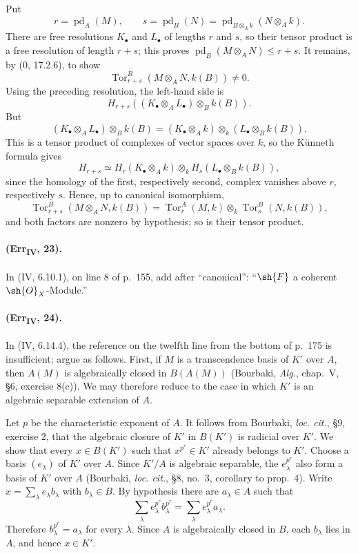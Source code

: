 Put
\[
 r=\operatorname{pd}_A(M),\qquad
 s=\operatorname{pd}_B(N)=
   \operatorname{pd}_{B\otimes_Ak}(N\otimes_Ak).
\]
There are free resolutions $K_\bullet$ and $L_\bullet$ of lengths $r$
and $s$, so their tensor product is a free resolution of length $r+s$;
this proves
$\operatorname{pd}_B(M\otimes_AN)\leq r+s$.  It remains, by
($0$, 17.2.6), to show
\[
 \operatorname{Tor}^{B}_{r+s}(M\otimes_AN,k(B))\neq0.
\]
Using the preceding resolution, the left-hand side is
\[
 H_{r+s}((K_\bullet\otimes_AL_\bullet)\otimes_Bk(B)).
\]
But
\[
 (K_\bullet\otimes_AL_\bullet)\otimes_Bk(B)
 = (K_\bullet\otimes_Ak)\otimes_k
   (L_\bullet\otimes_Bk(B)).
\]
This is a tensor product of complexes of vector spaces over $k$, so the
K\"unneth formula gives
\[
 H_{r+s}\simeq H_r(K_\bullet\otimes_Ak)\otimes_k
 H_s(L_\bullet\otimes_Bk(B)),
\]
since the homology of the first, respectively second, complex vanishes
above $r$, respectively $s$.  Hence, up to canonical isomorphism,
\[
 \operatorname{Tor}^{B}_{r+s}(M\otimes_AN,k(B))=
 \operatorname{Tor}^{A}_{r}(M,k)\otimes_k
 \operatorname{Tor}^{B}_{s}(N,k(B)),
\]
and both factors are nonzero by hypothesis; so is their tensor product.

\paragraph{(Err\textsubscript{IV}, 23).}
In (IV, 6.10.1), on line 8 of p.~155, add after ``canonical'':
``$\sh{F}$ a coherent $\sh{O}_X$-Module.''

\paragraph{(Err\textsubscript{IV}, 24).}
In (IV, 6.14.4), the reference on the twelfth line from the bottom of
p.~175 is insufficient; argue as follows.  First, if $M$ is a
transcendence basis of $K'$ over $A$, then $A(M)$ is algebraically closed
in $B(A(M))$ (Bourbaki, \emph{Alg.}, chap.~V, \S6, exercise 8(c)).  We
may therefore reduce to the case in which $K'$ is an algebraic separable
extension of $A$.

Let $p$ be the characteristic exponent of $A$.  It follows from
Bourbaki, \emph{loc. cit.}, \S9, exercise 2, that the algebraic closure
of $K'$ in $B(K')$ is radicial over $K'$.  We show that every
$x\in B(K')$ such that $x^{p^r}\in K'$ already belongs to $K'$.
Choose a basis $(e_\lambda)$ of $K'$ over $A$.  Since $K'/A$ is
algebraic separable, the $e_\lambda^{p^r}$ also form a basis of $K'$ over
$A$ (Bourbaki, \emph{loc. cit.}, \S8, no.~3, corollary to prop.~4).
Write $x=\sum_\lambda e_\lambda b_\lambda$ with $b_\lambda\in B$.  By
hypothesis there are $a_\lambda\in A$ such that
\[
 \sum_\lambda e_\lambda^{p^r}b_\lambda^{p^r}
 =\sum_\lambda e_\lambda^{p^r}a_\lambda.
\]
Therefore $b_\lambda^{p^r}=a_\lambda$ for every $\lambda$.  Since $A$
is algebraically closed in $B$, each $b_\lambda$ lies in $A$, and hence
$x\in K'$.

